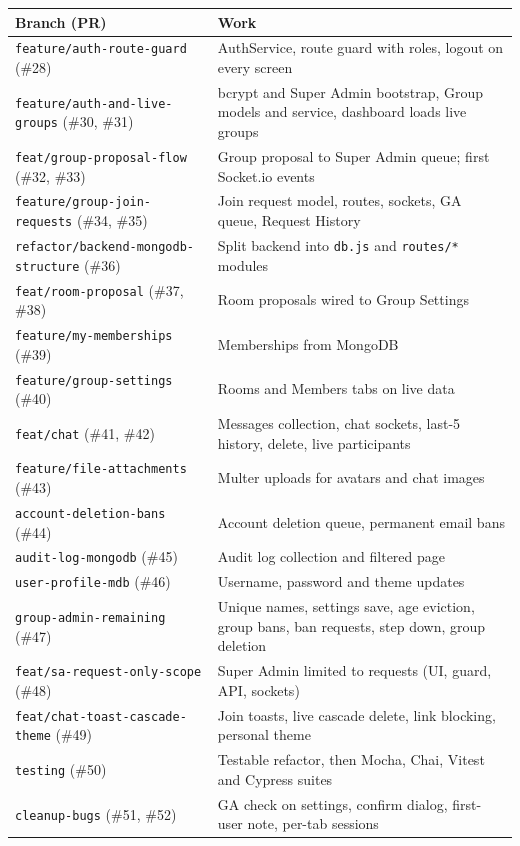 \documentclass[10pt,a4paper]{article}
\newcommand{\ep}[1]{\texttt{\small #1}}
\begin{document}
\small
\begin{longtable}{L{5.8cm} L{10.3cm}}
\toprule
\textbf{Branch (PR)} & \textbf{Work}\\
\midrule
\endhead
\ep{feature/auth-route-guard} (\#28) & AuthService, route guard with roles, logout on every screen\\
\ep{feature/auth-and-live-groups} (\#30, \#31) & bcrypt and Super Admin bootstrap, Group models and service, dashboard loads live groups\\
\ep{feat/group-proposal-flow} (\#32, \#33) & Group proposal to Super Admin queue; first Socket.io events\\
\ep{feature/group-join-requests} (\#34, \#35) & Join request model, routes, sockets, GA queue, Request History\\
\ep{refactor/backend-mongodb-structure} (\#36) & Split backend into \ep{db.js} and \ep{routes/*} modules\\
\ep{feat/room-proposal} (\#37, \#38) & Room proposals wired to Group Settings\\
\ep{feature/my-memberships} (\#39) & Memberships from MongoDB\\
\ep{feature/group-settings} (\#40) & Rooms and Members tabs on live data\\
\ep{feat/chat} (\#41, \#42) & Messages collection, chat sockets, last-5 history, delete, live participants\\
\ep{feature/file-attachments} (\#43) & Multer uploads for avatars and chat images\\
\ep{account-deletion-bans} (\#44) & Account deletion queue, permanent email bans\\
\ep{audit-log-mongodb} (\#45) & Audit log collection and filtered page\\
\ep{user-profile-mdb} (\#46) & Username, password and theme updates\\
\ep{group-admin-remaining} (\#47) & Unique names, settings save, age eviction, group bans, ban requests, step down, group deletion\\
\ep{feat/sa-request-only-scope} (\#48) & Super Admin limited to requests (UI, guard, API, sockets)\\
\ep{feat/chat-toast-cascade-theme} (\#49) & Join toasts, live cascade delete, link blocking, personal theme\\
\ep{testing} (\#50) & Testable refactor, then Mocha, Chai, Vitest and Cypress suites\\
\ep{cleanup-bugs} (\#51, \#52) & GA check on settings, confirm dialog, first-user note, per-tab sessions\\
\bottomrule
\end{longtable}
\normalsize
\end{document}
